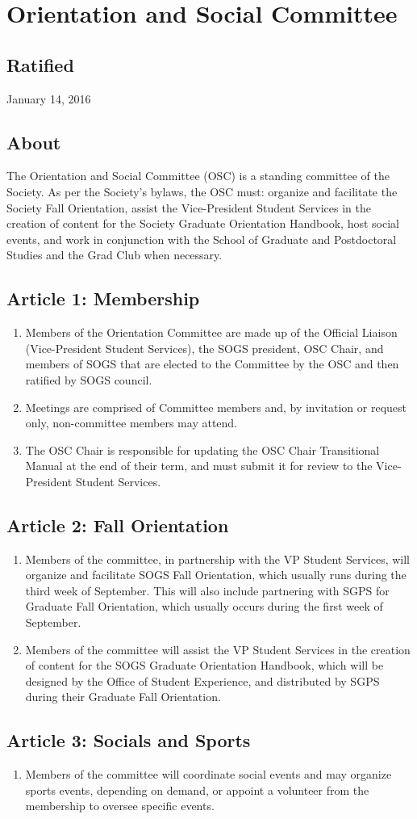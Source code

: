 \section{Orientation and Social Committee}
\subsection{Ratified}
January 14, 2016
\subsection{About}
The Orientation and Social Committee (OSC) is a standing committee of the Society. As per the Society's bylaws, the OSC must: organize and facilitate the Society Fall Orientation, assist the Vice-President Student Services in the creation of content for the Society Graduate Orientation Handbook, host social events, and work in conjunction with the School of Graduate and Postdoctoral Studies and the Grad Club when necessary.
\subsection{Article 1: Membership}
\begin{enumerate}
\item Members of the Orientation Committee are made up of the Official Liaison (Vice-President Student Services), the SOGS president, OSC Chair, and members of SOGS that are elected to the Committee by the OSC and then ratified by SOGS council.
\item Meetings are comprised of Committee members and, by invitation or request only, non-committee members may attend.
\item The OSC Chair is responsible for updating the OSC Chair Transitional Manual at the end of their term, and must submit it for review to the Vice-President Student Services.
\end{enumerate}
\subsection{Article 2: Fall Orientation}
\begin{enumerate}
\item Members of the committee, in partnership with the VP Student Services, will organize and facilitate SOGS Fall Orientation, which usually runs during the third week of September. This will also include partnering with SGPS for Graduate Fall Orientation, which usually occurs during the first week of September.
\item Members of the committee will assist the VP Student Services in the creation of content for the SOGS Graduate Orientation Handbook, which will be designed by the Office of Student Experience, and distributed by SGPS during their Graduate Fall Orientation.
\end{enumerate}
\subsection{Article 3: Socials and Sports}
\begin{enumerate}
\item Members of the committee will coordinate social events and may organize sports events, depending on demand, or appoint a volunteer from the membership to oversee specific events.
\end{enumerate}